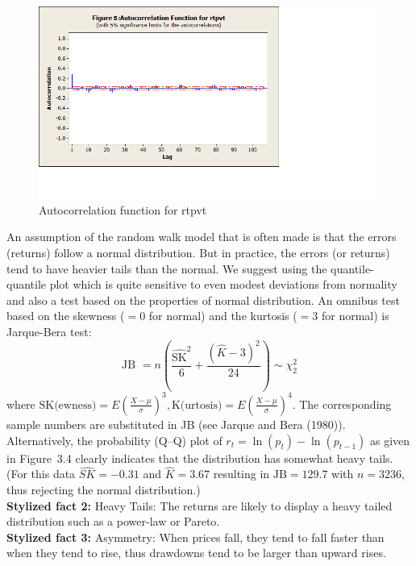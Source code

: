 	\begin{figure}[!ht]
	\centering
	\includegraphics[width=\textwidth]{chapters/chapter_uvts/figures/Sec2-4Fig5.png}
	\caption{Autocorrelation function for rtpvt \label{fig:autocorrtpvt}}
	\end{figure}
An assumption of the random walk model that is often made is that the errors (returns)
follow a normal distribution. But in practice, the errors (or returns) tend to have heavier tails than the normal. We suggest using the quantile-quantile plot which is quite sensitive to even modest deviations from normality and also a test based on the properties of normal distribution. An omnibus test based on the skewness ($=0$ for normal) and the kurtosis ($=3$ for normal) is Jarque-Bera test:
	\begin{equation}\label{eqn:2JB}
	\text{JB }= n\left(\frac{\widehat{\text{SK}}^2}{6} + \frac{(\hat{K} - 3)^2}{24}\right) \sim \chi_2^2
	\end{equation}
where $\text{SK}\text{(ewness)}= E(\frac{X-\mu}{\sigma})^3, \text{K}\text{(urtosis)} = E(\frac{X-\mu}{\sigma})^4$. The corresponding sample numbers are substituted in JB (see Jarque and Bera (1980)\cite{jarque80}). Alternatively, the probability (Q--Q) plot of $r_t = \ln{(p_t)} - \ln{(p_{t-1})}$ as given in Figure~3.4 clearly indicates that the distribution has somewhat heavy tails. (For this data $\widehat{SK} = -0.31$ and $\hat{K} = 3.67$ resulting in $\text{JB}= 129.7$ with $n= 3236$, thus rejecting the normal distribution.) \\


\noindent\textbf{Stylized fact 2:} Heavy Tails: The returns are likely to display a heavy
tailed distribution such as a power-law or Pareto. \\


\noindent\textbf{Stylized fact 3:} Asymmetry: When prices fall, they tend to fall faster
than when they tend to rise, thus drawdowns tend to be larger than upward rises. \\


